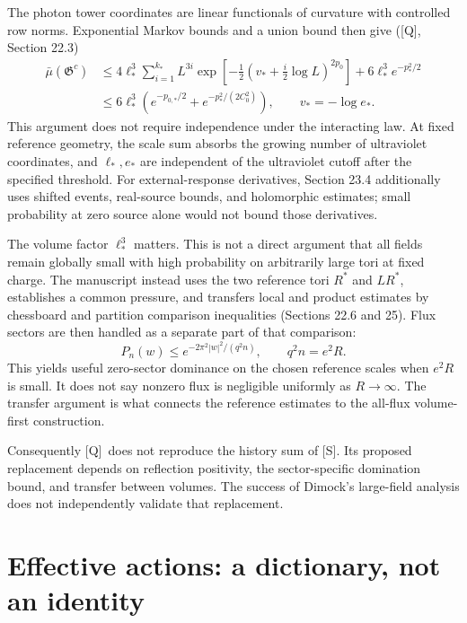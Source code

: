 \documentclass[11pt]{article}
\numberwithin{equation}{section}
\newcommand{\Q}{\textup{[Q]}}
\newcommand{\US}{\textup{[S]}}
\begin{document}
The photon tower coordinates are linear functionals of curvature
with controlled row norms. Exponential Markov bounds and a union
bound then give (\Q, Section 22.3)
\begin{align}
 \bar\mu(\mathfrak G^c)
 &\le4\ell_*^3\sum_{i=1}^{k_*}L^{3i}
   \exp\left[-\tfrac12
          (v_*+\tfrac i2\log L)^{2p_0}\right]
       +6\ell_*^3e^{-p_*^2/2}\\
 &\le6\ell_*^3
       \left(e^{-p_{0,*}/2}+e^{-p_*^2/(2C_0^2)}\right),
 \qquad v_*=-\log e_*.
 \label{eq:digest-tail}
\end{align}
This argument does not require independence under the interacting
law. At fixed reference geometry, the scale sum absorbs the growing
number of ultraviolet coordinates, and $\ell_*,e_*$ are independent
of the ultraviolet cutoff after the specified threshold.
For external-response derivatives, Section 23.4 additionally uses
shifted events, real-source bounds, and holomorphic estimates; small
probability at zero source alone would not bound those derivatives.

The volume factor $\ell_*^3$ matters. This is not a direct argument
that all fields remain globally small with high probability on
arbitrarily large tori at fixed charge. The manuscript instead uses
the two reference tori $R^*$ and $LR^*$, establishes a common pressure,
and transfers local and product estimates by chessboard and partition
comparison inequalities (Sections 22.6 and 25).
Flux sectors are then handled as a separate part of that comparison:
\begin{equation}
 P_n(w)\le e^{-2\pi^2|w|^2/(q^2n)},\qquad q^2n=e^2R.
\end{equation}
This yields useful zero-sector dominance on the chosen reference
scales when $e^2R$ is small. It does not say nonzero flux is negligible
uniformly as $R\to\infty$. The transfer argument is what connects
the reference estimates to the all-flux volume-first construction.

Consequently \Q\ does not reproduce the history sum of \US.
Its proposed replacement depends on reflection positivity, the
sector-specific domination bound, and transfer between volumes.
The success of Dimock's large-field analysis does not independently
validate that replacement.

\section{Effective actions: a dictionary, not an identity}
\end{document}
